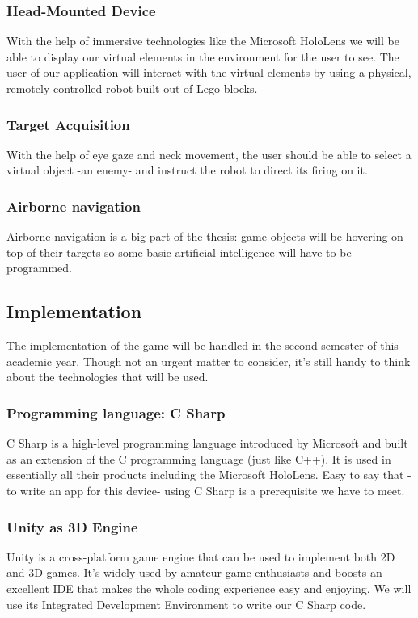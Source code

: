 \documentclass{article}
\begin{document}
\subsubsection{Head-Mounted Device}
With the help of immersive technologies like the Microsoft HoloLens we will be able to display our virtual elements in the environment for the user to see. The user of our application will interact with the virtual elements by using a physical, remotely controlled robot built out of Lego blocks. 
\subsubsection{Target Acquisition}
With the help of eye gaze and neck movement, the user should be able to select a virtual object -an enemy- and instruct the robot to direct its firing on it.

\subsubsection{Airborne navigation}
Airborne navigation is a big part of the thesis: game objects will be hovering on top of
their targets so some basic artificial intelligence will have to be programmed.

\subsection{Implementation}
The implementation of the game will be handled in the second semester of this academic year. Though not an urgent matter to consider, it's still handy to think about the technologies that will be used.

\subsubsection{Programming language: C Sharp}
C Sharp is a high-level programming language introduced by Microsoft and built as an extension of the C programming language (just like C++). It is used in essentially all their products including the Microsoft HoloLens. Easy to say that -to write an app for this device- using C Sharp is a prerequisite we have to meet. 

\subsubsection{Unity as 3D Engine}
Unity is a cross-platform game engine that can be used to implement both 2D and 3D games. It's widely used by amateur game enthusiasts and boosts an excellent IDE that makes the whole coding experience easy and enjoying. We will use its Integrated Development Environment to write our C Sharp code.
\end{document}
